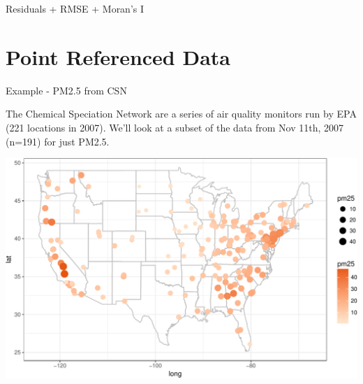 \documentclass[11pt,ignorenonframetext,]{beamer}
\newenvironment{Shaded}{}{}
\newcommand{\KeywordTok}[1]{\textcolor[rgb]{0.00,0.44,0.13}{\textbf{#1}}}
\newcommand{\DataTypeTok}[1]{\textcolor[rgb]{0.56,0.13,0.00}{#1}}
\newcommand{\DecValTok}[1]{\textcolor[rgb]{0.25,0.63,0.44}{#1}}
\newcommand{\StringTok}[1]{\textcolor[rgb]{0.25,0.44,0.63}{#1}}
\newcommand{\CommentTok}[1]{\textcolor[rgb]{0.38,0.63,0.69}{\textit{#1}}}
\newcommand{\OperatorTok}[1]{\textcolor[rgb]{0.40,0.40,0.40}{#1}}
\newcommand{\NormalTok}[1]{#1}
\let\oldShaded\Shaded
\let\endoldShaded\endShaded
\renewenvironment{Shaded}{\footnotesize\begin{spacing}{0.9}\oldShaded}{\endoldShaded\end{spacing}}
\begin{document}
\begin{frame}[fragile,t]{Residuals + RMSE + Moran's I}

\begin{Shaded}
\end{Shaded}

\end{frame}

\section{Point Referenced Data}\label{point-referenced-data}

\begin{frame}{Example - PM2.5 from CSN}

The Chemical Speciation Network are a series of air quality monitors run
by EPA (221 locations in 2007). We'll look at a subset of the data from
Nov 11th, 2007 (n=191) for just PM2.5.

\includegraphics{Lec20_files/figure-beamer/unnamed-chunk-12-1.pdf}

\end{frame}
\end{document}
